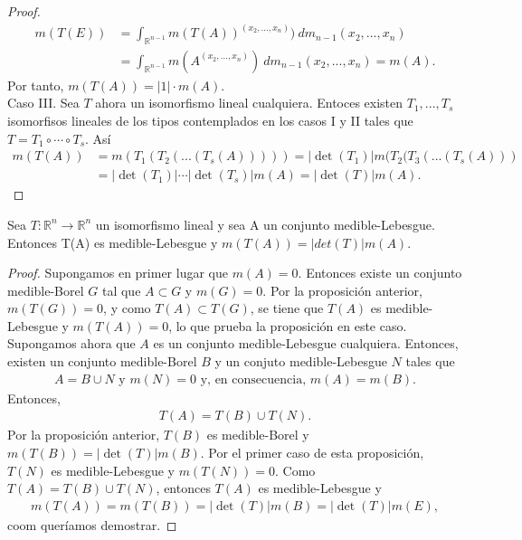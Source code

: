 \begin{proof}
\begin{align*}
    m(T(E)) &= \int_{\mathbb{R}^{n-1}}{m(T(A))^{(x_2,...,x_n)}) \ dm_{n-1}(x_2,...,x_n)} \\
    &= \int_{\mathbb{R}^{n-1}}{m(A^{(x_2,...,x_n)}) \ dm_{n-1}(x_2,...,x_n)} = m(A).
\end{align*}
Por tanto, $m(T(A)) = |1|\cdot m(A)$.
\\
\newline 
Caso III. Sea $T$ ahora un isomorfismo lineal cualquiera. Entoces existen $T_1,...,T_s$ isomorfisos lineales de los tipos contemplados en los casos I y II tales que  $T = T_1 \circ \cdots \circ T_s$. Así
\begin{align*}
    m(T(A)) &= m(T_1(T_2(...(T_s(A))))) = |\det(T_1)|m(T_2(T_3(...(T_s(A))) \\
    &= |\det(T_1)| \cdots |\det(T_s)|m(A) = |\det(T)|m(A).
\end{align*}
\end{proof}

\begin{prop}
Sea $T: \mathbb{R}^n \longrightarrow \mathbb{R}^n$ un isomorfismo lineal y sea A un conjunto medible-Lebesgue. Entonces T(A) es medible-Lebesgue y $m(T(A)) = |det(T)|m(A)$.
\end{prop}

\begin{proof}
Supongamos en primer lugar que $m(A) = 0$. Entonces existe un conjunto medible-Borel $G$ tal que $A \subset G$ y $m(G) = 0$. Por la proposición anterior, $m(T(G)) = 0$, y como $T(A) \subset T(G)$, se tiene que $T(A)$ es medible-Lebesgue y $m(T(A)) = 0$, lo que prueba la proposición en este caso.
\\
\newline
Supongamos ahora que $A$ es un conjunto medible-Lebesgue cualquiera. Entonces, existen un conjunto medible-Borel $B$ y un conjuto medible-Lebesgue $N$ tales que
\begin{align*}
    A = B \cup N \text{ y } m(N) = 0 \text{ y, en consecuencia, } m(A) = m(B).
\end{align*}
Entonces,
\begin{align*}
    T(A) = T(B) \cup T(N).
\end{align*}
Por la proposición anterior, $T(B)$ es medible-Borel y $m(T(B)) = |\det(T)|m(B)$. Por el primer caso de esta proposición, $T(N)$ es medible-Lebesgue y $m(T(N)) = 0$. Como $T(A) = T(B) \cup T(N)$, entonces $T(A)$ es medible-Lebesgue y
\begin{align*}
    m(T(A)) = m(T(B)) = |\det(T)|m(B) = |\det(T)|m(E),
\end{align*}
coom queríamos demostrar.
\end{proof}

